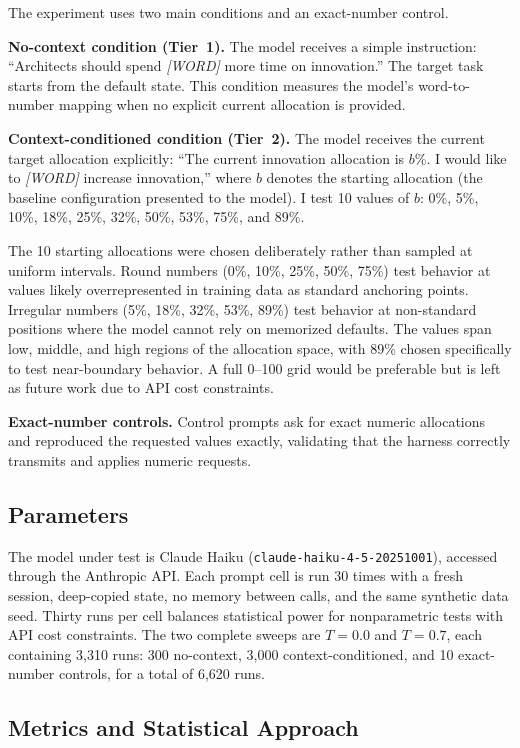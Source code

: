 \documentclass[11pt]{article}
\begin{document}
The experiment uses two main conditions and an exact-number control.

\textbf{No-context condition (Tier~1).} The model receives a simple instruction: ``Architects should spend \textit{[WORD]} more time on innovation.'' The target task starts from the default state. This condition measures the model's word-to-number mapping when no explicit current allocation is provided.

\textbf{Context-conditioned condition (Tier~2).} The model receives the current target allocation explicitly: ``The current innovation allocation is $b$\%. I would like to \textit{[WORD]} increase innovation,'' where $b$ denotes the starting allocation (the baseline configuration presented to the model). I test 10 values of $b$: 0\%, 5\%, 10\%, 18\%, 25\%, 32\%, 50\%, 53\%, 75\%, and 89\%.

The 10 starting allocations were chosen deliberately rather than sampled at uniform intervals. Round numbers (0\%, 10\%, 25\%, 50\%, 75\%) test behavior at values likely overrepresented in training data as standard anchoring points. Irregular numbers (5\%, 18\%, 32\%, 53\%, 89\%) test behavior at non-standard positions where the model cannot rely on memorized defaults. The values span low, middle, and high regions of the allocation space, with 89\% chosen specifically to test near-boundary behavior. A full 0--100 grid would be preferable but is left as future work due to API cost constraints.

\textbf{Exact-number controls.} Control prompts ask for exact numeric allocations and reproduced the requested values exactly, validating that the harness correctly transmits and applies numeric requests.

\subsection{Parameters}

The model under test is Claude Haiku (\texttt{claude-haiku-4-5-20251001}), accessed through the Anthropic API. Each prompt cell is run 30 times with a fresh session, deep-copied state, no memory between calls, and the same synthetic data seed. Thirty runs per cell balances statistical power for nonparametric tests with API cost constraints. The two complete sweeps are $T{=}0.0$ and $T{=}0.7$, each containing 3,310 runs: 300 no-context, 3,000 context-conditioned, and 10 exact-number controls, for a total of 6,620 runs.

\subsection{Metrics and Statistical Approach}
\end{document}
